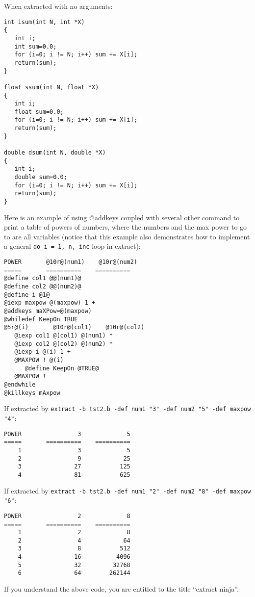 \noindent
When extracted with no arguments:
\begin{verbatim}
int isum(int N, int *X)
{
   int i;
   int sum=0.0;
   for (i=0; i != N; i++) sum += X[i];
   return(sum);
}

float ssum(int N, float *X)
{
   int i;
   float sum=0.0;
   for (i=0; i != N; i++) sum += X[i];
   return(sum);
}

double dsum(int N, double *X)
{
   int i;
   double sum=0.0;
   for (i=0; i != N; i++) sum += X[i];
   return(sum);
}
\end{verbatim}

Here is an example of using @addkeys coupled with several other command
to print a table of powers of numbers, where the numbers and the max
power to go to are all variables (notice that this example also
demonstrates how to implement a general {\tt do i = 1, n, inc} loop in
extract):

\begin{verbatim}
POWER       @10r@(num1)    @10r@(num2)
=====       ==========    ==========
@define col1 @@(num1)@
@define col2 @@(num2)@
@define i @1@
@iexp maxpow @(maxpow) 1 +
@addkeys maXPow=@(maxpow)
@whiledef KeepOn TRUE
@5r@(i)       @10r@(col1)    @10r@(col2)
   @iexp col1 @(col1) @(num1) *
   @iexp col2 @(col2) @(num2) *
   @iexp i @(i) 1 +
   @MAXPOW ! @(i)
      @define KeepOn @TRUE@
   @MAXPOW !
@endwhile
@killkeys mAxpow
\end{verbatim}

If extracted by
{\tt extract -b tst2.b -def num1 "3" -def num2 "5" -def maxpow "4"}:
\begin{verbatim}
POWER                3             5
=====       ==========    ==========
    1                3             5
    2                9            25
    3               27           125
    4               81           625
\end{verbatim}

If extracted by
{\tt extract -b tst2.b -def num1 "2" -def num2 "8" -def maxpow "6"}:
\begin{verbatim}
POWER                2             8
=====       ==========    ==========
    1                2             8
    2                4            64
    3                8           512
    4               16          4096
    5               32         32768
    6               64        262144
\end{verbatim}

If you understand the above code, 
you are entitled to the title ``extract ninja''.

